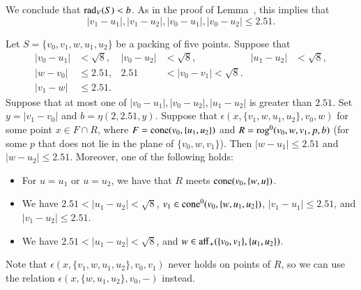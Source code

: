 \begin{tarskidata}
\begin{tarski}
\begin{proved}
We conclude that $\operatorname{rad}_V(S) < b$.
As in the proof of Lemma~,
this implies that
   $$
   |v_1-u_1|,|v_1-u_2|,|v_0-u_1|,|v_0-u_2| \le 2.51.
   $$
\swallowed\end{proved}
\end{tarski}





\begin{tarski}

\begin{lemma}
 Let $S=\{v_0,v_1,w,u_1,u_2\}$ be a packing of five points.
Suppose that 
   $$
   \begin{array}{rlrlrll}
   |v_0-u_1|&<\sqrt8,& |v_0-u_2|&<\sqrt8,& |u_1-u_2|&<\sqrt8,\\
   |w-v_0|&\le 2.51, &2.51&<|v_0-v_1|<\sqrt8.\\
   |v_1-w|&\le 2.51.
   \end{array}
   $$
Suppose that at most one of $|v_0-u_1|,|v_0-u_2|,|u_1-u_2|$ is
greater than $2.51$.
%
Set $y=|v_1-v_0|$ and $b=\eta(2,2.51,y)$.
Suppose that $\epsilon(x,\{v_1,w,u_1,u_2\},v_0,w)$ for some point
$x\in F\cap R$, where $F={\operatorname{cone}}(v_0,\{u_1,u_2\})$ and
$R={\operatorname{rog}}^0(v_0,w,v_1,p,b)$ (for some $p$ that
does not lie in the plane of $\{v_0,w,v_1\}$).
Then $|w-u_1|\le 2.51$ and  $|w-u_2|\le 2.51$.
Moreover, one of the following holds:
  \begin{itemize}
  \item
  For $u=u_1$ or $u=u_2$, we have that
  $R$ meets ${\operatorname{cone}}(v_0,\{w,u\})$.
  \item  We have $2.51<|u_1-u_2|<\sqrt8$, 
  $v_1\in{\operatorname{cone}}^0(v_0,\{w,u_1,u_2\})$, 
  $|v_1-u_1|\le 2.51$, and $|v_1-u_2|\le 2.51$.
  \item  We have $2.51<|u_1-u_2|<\sqrt8$, and 
  $w\in{\operatorname{aff}}_+(\{v_0,v_1\},\{u_1,u_2\})$.
  \end{itemize}
\end{lemma}

\begin{proved}  
Note that $\epsilon(x,\{v_1,w,u_1,u_2\},v_0,v_1)$ never holds
on points of $R$, so we can use the relation
$\epsilon(x,\{w,u_1,u_2\},v_0,-)$ instead.


\end{proved}
\end{tarski}
\end{tarskidata}
